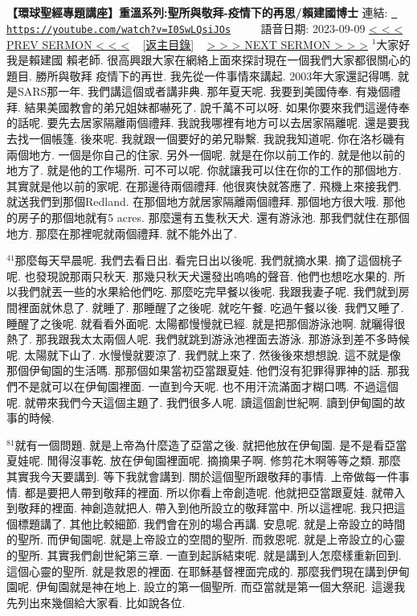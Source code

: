 \documentclass{book}
\begin{document}
\section{}
\label{sec:I0SwLQsiJOs}
\textbf{【環球聖經專題講座】重溫系列:聖所與敬拜-疫情下的再思/賴建國博士}
\newline
\newline
連結: \href{https://youtube.com/watch?v=I0SwLQsiJOs}{\texttt{ https://youtube.com/watch?v=I0SwLQsiJOs}} ~~~~ 語音日期: 2023-09-09 
\newline
\newline
\hyperref[sec:zm_TxjjjYm8]{\small{< < < PREV SERMON < < <}}
~
\hyperref[sec:index]{\small{[返主目錄]}}
~
\hyperref[sec:ECCsRtsc_50]{\small{> > > NEXT SERMON > > >}}
\newline
\newline
$^{1}$大家好 我是賴建國 賴老師.
很高興跟大家在網絡上面來探討現在一個我們大家都很關心的題目.
勝所與敬拜 疫情下的再世.
我先從一件事情來講起.
2003年大家還記得嗎.
就是SARS那一年.
我們講這個或者講非典.
那年夏天呢.
我要到美國侍奉.
有幾個禮拜.
結果美國教會的弟兄姐妹都嚇死了.
說千萬不可以呀.
如果你要來我們這邊侍奉的話呢.
要先去居家隔離兩個禮拜.
我說我哪裡有地方可以去居家隔離呢.
還是要我去找一個帳篷.
後來呢.
我就跟一個要好的弟兄聯繫.
我說我知道呢.
你在洛杉磯有兩個地方.
一個是你自己的住家.
另外一個呢.
就是在你以前工作的.
就是他以前的地方了.
就是他的工作場所.
可不可以呢.
你就讓我可以住在你的工作的那個地方.
其實就是他以前的家呢.
在那邊待兩個禮拜.
他很爽快就答應了.
飛機上來接我們.
就送我們到那個Redland.
在那個地方就居家隔離兩個禮拜.
那個地方很大哦.
那他的房子的那個地就有5 acres.
那麼還有五隻秋天犬.
還有游泳池.
那我們就住在那個地方.
那麼在那裡呢就兩個禮拜.
就不能外出了.

$^{41}$那麼每天早晨呢.
我們去看日出.
看完日出以後呢.
我們就摘水果.
摘了這個桃子呢.
也發現說那兩只秋天.
那幾只秋天犬還發出嗚嗚的聲音.
他們也想吃水果的.
所以我們就丟一些的水果給他們吃.
那麼吃完早餐以後呢.
我跟我妻子呢.
我們就到房間裡面就休息了.
就睡了.
那睡醒了之後呢.
就吃午餐.
吃過午餐以後.
我們又睡了.
睡醒了之後呢.
就看看外面呢.
太陽都慢慢就已經.
就是把那個游泳池啊.
就曬得很熱了.
那我跟我太太兩個人呢.
我們就跳到游泳池裡面去游泳.
那游泳到差不多時候呢.
太陽就下山了.
水慢慢就要涼了.
我們就上來了.
然後後來想想說.
這不就是像那個伊甸園的生活嗎.
那那個如果當初亞當跟夏娃.
他們沒有犯罪得罪神的話.
那我們不是就可以在伊甸園裡面.
一直到今天呢.
也不用汗流滿面才糊口嗎.
不過這個呢.
就帶來我們今天這個主題了.
我們很多人呢.
讀這個創世紀啊.
讀到伊甸園的故事的時候.

$^{81}$就有一個問題.
就是上帝為什麼造了亞當之後.
就把他放在伊甸園.
是不是看亞當夏娃呢.
閒得沒事乾.
放在伊甸園裡面呢.
摘摘果子啊.
修剪花木啊等等之類.
那麼其實我今天要講到.
等下我就會講到.
關於這個聖所跟敬拜的事情.
上帝做每一件事情.
都是要把人帶到敬拜的裡面.
所以你看上帝創造呢.
他就把亞當跟夏娃.
就帶入到敬拜的裡面.
神創造就把人.
帶入到他所設立的敬拜當中.
所以這裡呢.
我只把這個標題講了.
其他比較細節.
我們會在別的場合再講.
安息呢.
就是上帝設立的時間的聖所.
而伊甸園呢.
就是上帝設立的空間的聖所.
而救恩呢.
就是上帝設立的心靈的聖所.
其實我們創世紀第三章.
一直到起訴結束呢.
就是講到人怎麼樣重新回到.
這個心靈的聖所.
就是救恩的裡面.
在耶穌基督裡面完成的.
那麼我們現在講到伊甸園呢.
伊甸園就是神在地上.
設立的第一個聖所.
而亞當就是第一個大祭祀.
這邊我先列出來幾個給大家看.
比如說各位.
\end{document}
